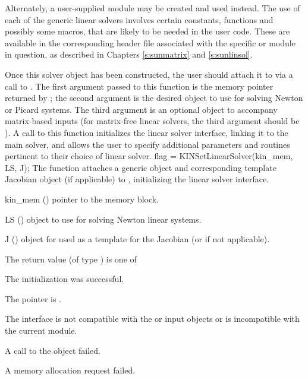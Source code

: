 Alternately, a user-supplied
 module may be created and used instead.  The use
of each of the generic linear solvers involves certain constants,
functions and possibly some macros, that are likely to be needed in
the user code.  These are available in the corresponding header file
associated with the specific {\sunmatrix} or {\sunlinsol} module in
question, as described in Chapters \ref{s:sunmatrix} and
\ref{s:sunlinsol}.

Once this solver object has been constructed, the user should attach
it to {\kinsol} via a call to .  The first
argument passed to this function is the {\kinsol} memory pointer
returned by ; the second argument is the desired
{\sunlinsol} object to use for solving Newton or Picard systems.  The
third argument is an optional {\sunmatrix} object to accompany
matrix-based {\sunlinsol} inputs (for matrix-free linear solvers, the
third argument should be ).  A call to this function
initializes the {\kinls} linear solver interface, linking it to the
main {\kinsol} solver, and allows the user to specify additional
parameters and routines pertinent to their choice of linear solver.
{
  flag = KINSetLinearSolver(kin\_mem, LS, J);
}
{
  The function  attaches a generic {\sunlinsol}
  object  and corresponding template Jacobian {\sunmatrix}
  object  (if applicable) to {\kinsol}, initializing the
  {\kinls} linear solver interface.
}
{
  \begin{args}
  \item[kin\_mem] ()
    pointer to the {\kinsol} memory block.
  \item[LS] ()
    {\sunlinsol} object to use for solving Newton linear systems.
  \item[J] ()
    {\sunmatrix} object for used as a template for the Jacobian (or
     if not applicable).
  \end{args}
}
{
  The return value  (of type ) is one of
  \begin{args}
  \item[\Id{KINLS\_SUCCESS}]
    The {\kinls} initialization was successful.
  \item[\Id{KINLS\_MEM\_NULL}]
    The  pointer is .
  \item[\Id{KINLS\_ILL\_INPUT}]
    The {\kinls} interface is not compatible with the  or
     input objects or is incompatible with the current
    {\nvector} module.
  \item[\Id{KINLS\_SUNLS\_FAIL}]
    A call to the  object failed.
  \item[\Id{KINLS\_MEM\_FAIL}]
    A memory allocation request failed.
  \end{args}
}
